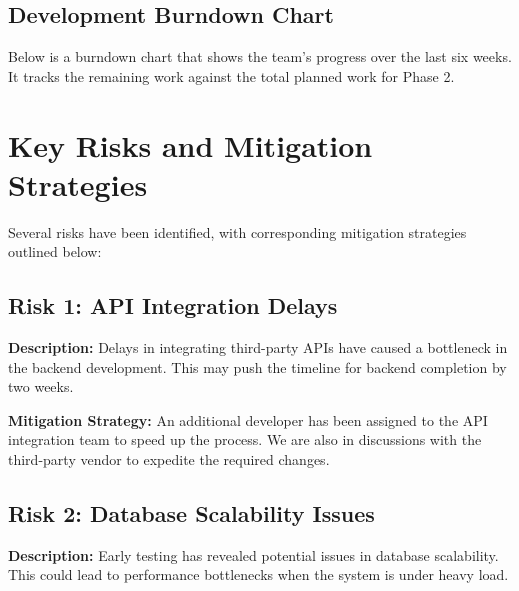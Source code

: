 \documentclass[12pt]{article}
\begin{document}
\subsection{Development Burndown Chart}
Below is a burndown chart that shows the team's progress over the last six weeks. It tracks the remaining work against the total planned work for Phase 2.

\begin{center}
\end{center}

\newpage
\section{Key Risks and Mitigation Strategies}
Several risks have been identified, with corresponding mitigation strategies outlined below:

\subsection{Risk 1: API Integration Delays}
\textbf{Description:} Delays in integrating third-party APIs have caused a bottleneck in the backend development. This may push the timeline for backend completion by two weeks.

\textbf{Mitigation Strategy:} An additional developer has been assigned to the API integration team to speed up the process. We are also in discussions with the third-party vendor to expedite the required changes.

\subsection{Risk 2: Database Scalability Issues}
\textbf{Description:} Early testing has revealed potential issues in database scalability. This could lead to performance bottlenecks when the system is under heavy load.
\end{document}
